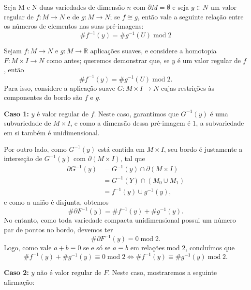 \documentclass[../differential_topology.tex]{subfiles}
\begin{document}
\hypertarget{homotopy_lemma}{
	\begin{lemma*}
		Seja M e N duas variedades de dimensão \(n\) com \(\partial M = \emptyset \) e seja \(y\in N\) um valor regular de \(f:M\rightarrow N\) e de \(g:M\rightarrow N\); se \(f\cong g\), então vale a seguinte relação entre os números de elementos nas suas pré-imagens:
		\[
			\# f^{-1}(y) = \#g^{-1}(U) \;\mathrm{mod}\; 2
		\]
	\end{lemma*}
}
\begin{proof*}
	Sejam \(f:M\rightarrow N\) e \(g:M\rightarrow \mathbb{R}\) aplicações suaves, e considere a homotopia \(F:M\times I\rightarrow N\) como antes; queremos demonstrar que, se \(y\) é um valor regular de \(f\), então
	\[
		\# f^{-1}(y) = \#g^{-1}(U) \;\mathrm{mod}\; 2.
	\]
	Para isso, considere a aplicação suave \(G:M\times I\rightarrow N\) cujas restrições às componentes do bordo são \(f\) e \(g\).

	\textbf{Caso 1:} \(y\) é valor regular de \(f\). Neste caso, garantimos que \(G^{-1}(y)\) é uma subvariedade de \(M\times I\), e como a dimensão dessa pré-imagem é 1, a subvariedade em si também é unidimensional.

	Por outro lado, como \(G^{-1}(y)\) está contida em \(M\times I\), seu bordo é justamente a interseção de \(G^{-1}(y)\) com \(\partial (M\times I)\), tal que
	\begin{align*}
		\partial G^{-1}(y) & = G^{-1}(y)\cap \partial (M\times I) \\
		                   & = G^{-1}(Y) \cap (M_{0}\cup M_1)     \\
		                   & = f^{-1}(y) \cup g^{-1}(y),
	\end{align*}
	e como a união é disjunta, obtemos
	\[
		\#\partial F^{-1}(y) = \#f^{-1}(y)+\#g^{-1}(y).
	\]
	No entanto, como toda variedade compacta unidimensional possui um número par de pontos no bordo, devemos ter
	\[
		\# \partial F^{-1}(y) = 0 \;\mathrm{mod}\;2.
	\]
	Logo, como vale \(a + b \equiv 0 \) se e só se \(a \equiv b\) em relações mod 2, concluímos que
	\[
		\#f^{-1}(y) + \#g^{-1}(y)\equiv 0 \; \mathrm{mod}\;2 \Longleftrightarrow \# f^{-1}(y) \equiv \# g^{-1}(y) \; \mathrm{mod}\; 2.
	\]

	\textbf{Caso 2:} \(y\) não é valor regular de \(F\). Neste caso, mostraremos a seguinte afirmação:


\end{proof*}
\end{document}
